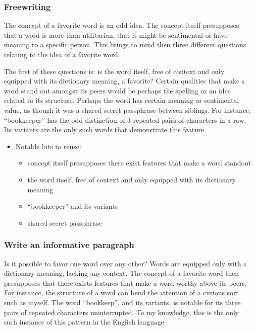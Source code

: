 \documentclass[12pt]{article}
\begin{document}
\subsubsection{Freewriting}

The concept of a favorite word is an odd idea.
The concept itself presupposes that a word is more than utilitarian, that it might be sentimental or have meaning to a specific person.
This brings to mind then three different questions relating to the idea of a favorite word.

The first of these questions is: is the word itself, free of context and only equipped with its dictionary meaning, a favorite?
Certain qualities that make a word stand out amongst its peers would be perhaps the spelling or an idea related to its structure.
Perhaps the word has certain meaning or sentimental value, as though it was a shared secret passphrase between siblings.
For instance, ``bookkeeper'' has the odd distinction of 3 repeated pairs of characters in a row.
Its variants are the only such words that demonstrate this feature.

\begin{itemize}
    \item Notable bits to reuse:
    \begin{itemize}
        \item concept itself presupposes there exist features that make a word standout
        \item the word itself, free of context and only equipped with its dictionary meaning
        \item ``bookkeeper'' and its variants
        \item shared secret passphrase
    \end{itemize}

\end{itemize}

\subsubsection{Write an informative paragraph}

Is it possible to favor one word over any other?
Words are equipped only with a dictionary meaning, lacking any context.
The concept of a favorite word then presupposes that there exists features that make a word worthy above its peers.
For instance, the structure of a word can bend the attention of a curious sort such as myself.
The word ``bookkeep'', and its variants, is notable for its three pairs of repeated characters uninterrupted.
To my knowledge, this is the only such instance of this pattern in the English language.
\end{document}
